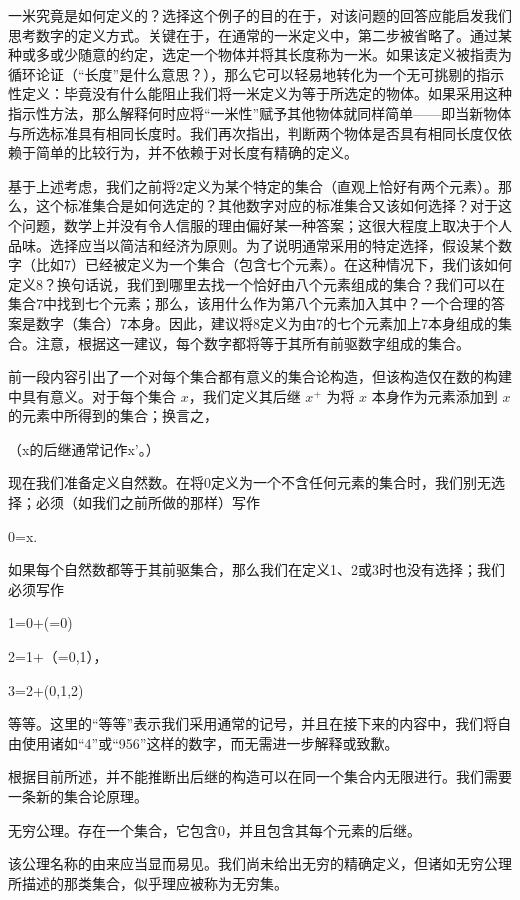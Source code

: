 \documentclass[12pt,a4paper]{ctexbook}
\theoremstyle{definition}
\theoremstyle{remark}
\begin{document}
{一米究竟是如何定义的？选择这个例子的目的在于，对该问题的回答应能启发我们思考数字的定义方式。关键在于，在通常的一米定义中，第二步被省略了。通过某种或多或少随意的约定，选定一个物体并将其长度称为一米。如果该定义被指责为循环论证（“长度”是什么意思？），那么它可以轻易地转化为一个无可挑剔的指示性定义：毕竟没有什么能阻止我们将一米定义为等于所选定的物体。如果采用这种指示性方法，那么解释何时应将“一米性”赋予其他物体就同样简单——即当新物体与所选标准具有相同长度时。我们再次指出，判断两个物体是否具有相同长度仅依赖于简单的比较行为，并不依赖于对长度有精确的定义。

基于上述考虑，我们之前将2定义为某个特定的集合（直观上恰好有两个元素）。那么，这个标准集合是如何选定的？其他数字对应的标准集合又该如何选择？对于这个问题，数学上并没有令人信服的理由偏好某一种答案；这很大程度上取决于个人品味。选择应当以简洁和经济为原则。为了说明通常采用的特定选择，假设某个数字（比如7）已经被定义为一个集合（包含七个元素）。在这种情况下，我们该如何定义8？换句话说，我们到哪里去找一个恰好由八个元素组成的集合？我们可以在集合7中找到七个元素；那么，该用什么作为第八个元素加入其中？一个合理的答案是数字（集合）7本身。因此，建议将8定义为由7的七个元素加上7本身组成的集合。注意，根据这一建议，每个数字都将等于其所有前驱数字组成的集合。

前一段内容引出了一个对每个集合都有意义的集合论构造，但该构造仅在数的构建中具有意义。对于每个集合 \( x \)，我们定义其后继 \( x^+ \) 为将 \( x \) 本身作为元素添加到 \( x \) 的元素中所得到的集合；换言之，

（x的后继通常记作x'。）

现在我们准备定义自然数。在将0定义为一个不含任何元素的集合时，我们别无选择；必须（如我们之前所做的那样）写作

0=x.

如果每个自然数都等于其前驱集合，那么我们在定义1、2或3时也没有选择；我们必须写作

1=0+(={0})

2=1+（={0,1}），

3=2+({0,1,2})

等等。这里的“等等”表示我们采用通常的记号，并且在接下来的内容中，我们将自由使用诸如“4”或“956”这样的数字，而无需进一步解释或致歉。

根据目前所述，并不能推断出后继的构造可以在同一个集合内无限进行。我们需要一条新的集合论原理。

无穷公理。存在一个集合，它包含0，并且包含其每个元素的后继。

该公理名称的由来应当显而易见。我们尚未给出无穷的精确定义，但诸如无穷公理所描述的那类集合，似乎理应被称为无穷集。

}
\end{document}
